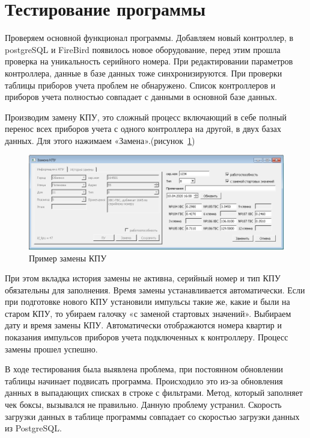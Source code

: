 
\section{Тестирование программы}
Проверяем основной функционал программы. Добавляем новый контроллер, в postgreSQL и FireBird появилось новое оборудование, перед этим прошла проверка на уникальность серийного номера. При редактировании параметров контроллера, данные в базе данных тоже синхронизируются. При проверки таблицы приборов учета проблем не обнаружено.
Список контроллеров и приборов учета полностью совпадает с данными в основной базе данных. 

Производим замену КПУ, это сложный процесс включающий в себе полный перенос всех приборов учета с одного контроллера на другой, в двух базах данных. Для этого нажимаем «Замена».(рисунок~\ref{fig:zamena})
\begin{figure}[H]
	\centering
	\includegraphics[width=0.9\linewidth]{pics/zamena}
	\caption{Пример замены КПУ}
	\label{fig:zamena}
\end{figure}
При этом вкладка история замены не активна, серийный номер и тип КПУ обязательны для заполнения. Время замены устанавливается автоматически. Если при подготовке нового КПУ установили импульсы такие же, какие и были на старом КПУ, то убираем галочку «с заменой стартовых значений». Выбираем дату и время замены КПУ. Автоматически отображаются номера квартир и показания импульсов приборов учета подключенных к контроллеру. Процесс замены прошел успешно.

В ходе тестирования была выявлена проблема, при постоянном обновлении таблицы начинает подвисать программа. Происходило это из-за обновления данных в выпадающих списках в строке с фильтрами. Метод, который заполняет чек боксы, вызывался не правильно. Данную проблему устранил. Скорость загрузки данных в таблице программы совпадает со скоростью загрузки данных из PostgreSQL.

